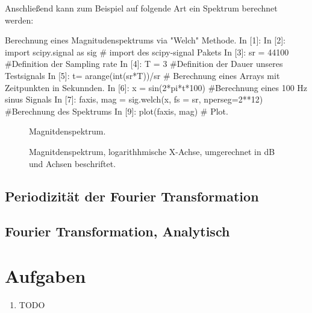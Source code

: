 
Anschließend kann zum Beispiel auf folgende Art ein Spektrum berechnet werden:

\begin{python}{Berechnung eines Magnitudenspektrums via "Welch" Methode.}
In [1]: %
In [2]: import scipy.signal as sig # import des scipy-signal Pakets
In [3]: sr = 44100 #Definition der Sampling rate
In [4]: T = 3 #Definition der Dauer unseres Testsignals
In [5]: t= arange(int(sr*T))/sr # Berechnung eines Arrays mit Zeitpunkten in Sekunnden.
In [6]: x = sin(2*pi*t*100) #Berechnung eines 100 Hz sinus Signals
In [7]: faxis, mag = sig.welch(x, fs = sr, nperseg=2**12) #Berechnung des Spektrums
In [9]: plot(faxis, mag) # Plot.
\end{python}


\begin{figure}[H]
    \centering
    
    \caption{Magnitdenspektrum.}
    \label{fig:specSimple}
\end{figure}



\begin{figure}[H]
    \centering
    
    \caption{Magnitdenspektrum, logarithhmische X-Achse, umgerechnet in dB und Achsen beschriftet.}
    \label{fig:specSimple_loglog}
\end{figure}

\subsection*{Periodizität der Fourier Transformation}

\subsection*{Fourier Transformation, Analytisch}

\section{Aufgaben}
\begin{enumerate}
\item TODO
\end{enumerate}
